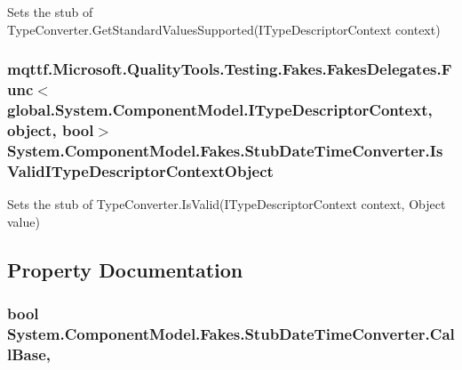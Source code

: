 Sets the stub of Type\-Converter.\-Get\-Standard\-Values\-Supported(\-I\-Type\-Descriptor\-Context context)

\hypertarget{class_system_1_1_component_model_1_1_fakes_1_1_stub_date_time_converter_afc3b3a6818520166c93d4446e5543be9}{
\subsubsection[{Is\-Valid\-I\-Type\-Descriptor\-Context\-Object}]{\setlength{\rightskip}{0pt plus 5cm}mqttf.\-Microsoft.\-Quality\-Tools.\-Testing.\-Fakes.\-Fakes\-Delegates.\-Func$<$global.\-System.\-Component\-Model.\-I\-Type\-Descriptor\-Context, object, bool$>$ System.\-Component\-Model.\-Fakes.\-Stub\-Date\-Time\-Converter.\-Is\-Valid\-I\-Type\-Descriptor\-Context\-Object}}\label{class_system_1_1_component_model_1_1_fakes_1_1_stub_date_time_converter_afc3b3a6818520166c93d4446e5543be9}


Sets the stub of Type\-Converter.\-Is\-Valid(\-I\-Type\-Descriptor\-Context context, Object value)



\subsection{Property Documentation}
\hypertarget{class_system_1_1_component_model_1_1_fakes_1_1_stub_date_time_converter_a8d56d865f58c86e4e35e4a1ea4221f24}{
\subsubsection[{Call\-Base}]{\setlength{\rightskip}{0pt plus 5cm}bool System.\-Component\-Model.\-Fakes.\-Stub\-Date\-Time\-Converter.\-Call\-Base\hspace{0.3cm}{\ttfamily [get]}, {\ttfamily [set]}}}\label{class_system_1_1_component_model_1_1_fakes_1_1_stub_date_time_converter_a8d56d865f58c86e4e35e4a1ea4221f24}


